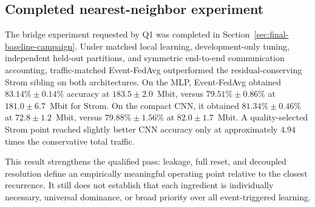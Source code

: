 \subsection{Completed nearest-neighbor experiment}

The bridge experiment requested by Q1 was completed in
Section~\ref{sec:final-baseline-campaign}.  Under matched local learning,
development-only tuning, independent held-out partitions, and symmetric
end-to-end communication accounting, traffic-matched Event-FedAvg outperformed
the residual-conserving Strom sibling on both architectures.  On the MLP,
Event-FedAvg obtained $83.14\%\pm0.14\%$ accuracy at
$183.5\pm2.0$~Mbit, versus $79.51\%\pm0.86\%$ at
$181.0\pm6.7$~Mbit for Strom.  On the compact CNN, it obtained
$81.34\%\pm0.46\%$ at $72.8\pm1.2$~Mbit, versus
$79.88\%\pm1.56\%$ at $82.0\pm1.7$~Mbit.  A quality-selected Strom point
reached slightly better CNN accuracy only at approximately $4.94$ times the
conservative total traffic.

This result strengthens the qualified pass: leakage, full reset, and
decoupled resolution define an empirically meaningful operating point relative
to the closest recurrence.  It still does not establish that each ingredient is
individually necessary, universal dominance, or broad priority over all
event-triggered learning.
